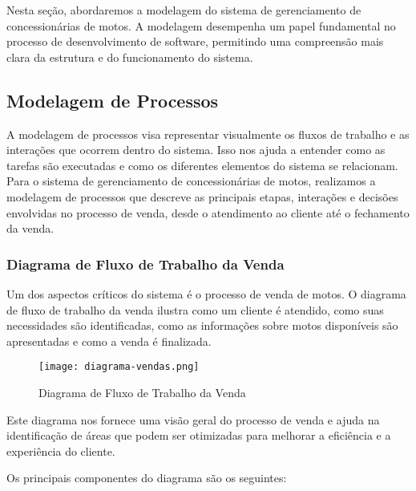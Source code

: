 Nesta seção, abordaremos a modelagem do sistema de gerenciamento de concessionárias de motos. A modelagem desempenha um papel fundamental no processo de desenvolvimento de software, permitindo uma compreensão mais clara da estrutura e do funcionamento do sistema.

\subsection{Modelagem de Processos}

A modelagem de processos visa representar visualmente os fluxos de trabalho e as interações que ocorrem dentro do sistema. Isso nos ajuda a entender como as tarefas são executadas e como os diferentes elementos do sistema se relacionam. Para o sistema de gerenciamento de concessionárias de motos, realizamos a modelagem de processos que descreve as principais etapas, interações e decisões envolvidas no processo de venda, desde o atendimento ao cliente até o fechamento da venda.

\subsubsection{Diagrama de Fluxo de Trabalho da Venda}

Um dos aspectos críticos do sistema é o processo de venda de motos. O diagrama de fluxo de trabalho da venda ilustra como um cliente é atendido, como suas necessidades são identificadas, como as informações sobre motos disponíveis são apresentadas e como a venda é finalizada.

\begin{figure}[h]
	\centering
	\texttt{[image: diagrama-vendas.png]}
	\caption{Diagrama de Fluxo de Trabalho da Venda}
	\label{fig:Diagrama de Fluxo de Trabalho da Venda}
\end{figure}

Este diagrama nos fornece uma visão geral do processo de venda e ajuda na identificação de áreas que podem ser otimizadas para melhorar a eficiência e a experiência do cliente.

Os principais componentes do diagrama são os seguintes:

